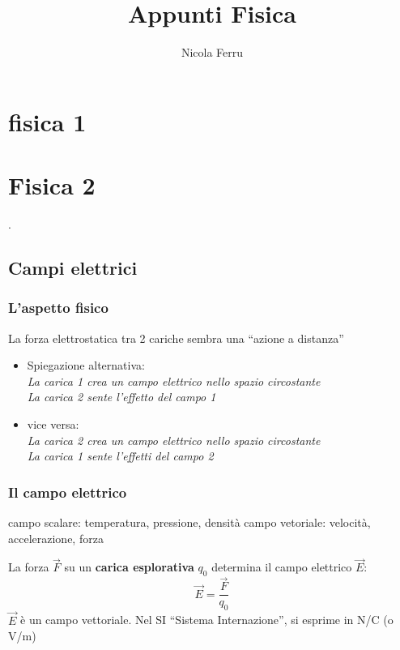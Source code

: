 \documentclass{book}
\title{Appunti Fisica}
\author{Nicola Ferru}
\date{}
\begin{document}
\maketitle
\tableofcontents
\listoftables
\listoffigures


\part{fisica 1}



\part {Fisica 2}


.\chapter{Campi elettrici}
\section {L'aspetto fisico}
La forza elettrostatica tra 2 cariche sembra una ``azione a distanza''
\begin{itemize}
\item Spiegazione alternativa:\\
  \textit{La carica 1 crea un campo elettrico nello spazio circostante}\\
  \textit{La carica 2 sente l'effetto del campo 1}\\
\item vice versa:\\
  \textit{La carica 2 crea un campo elettrico nello spazio circostante}\\
  \textit{La carica 1 sente l'effetti del campo 2}
\end{itemize}
\section {Il campo elettrico}
\begin{tasks}{2}
\task campo scalare: temperatura, pressione, densità
\task campo vetoriale: velocità, accelerazione, forza
\end{tasks}
La forza $\vec{F}$ su un \textbf{carica esplorativa} $q_0$ determina il campo elettrico $\vec{E}$:
\begin{equation}
  \vec{E}=\frac{\vec{F}}{q_0}
\end{equation}
$\vec{E}$ è un campo vettoriale. Nel SI ``Sistema Internazione'', si esprime in N/C (o V/m)
\end{document}
